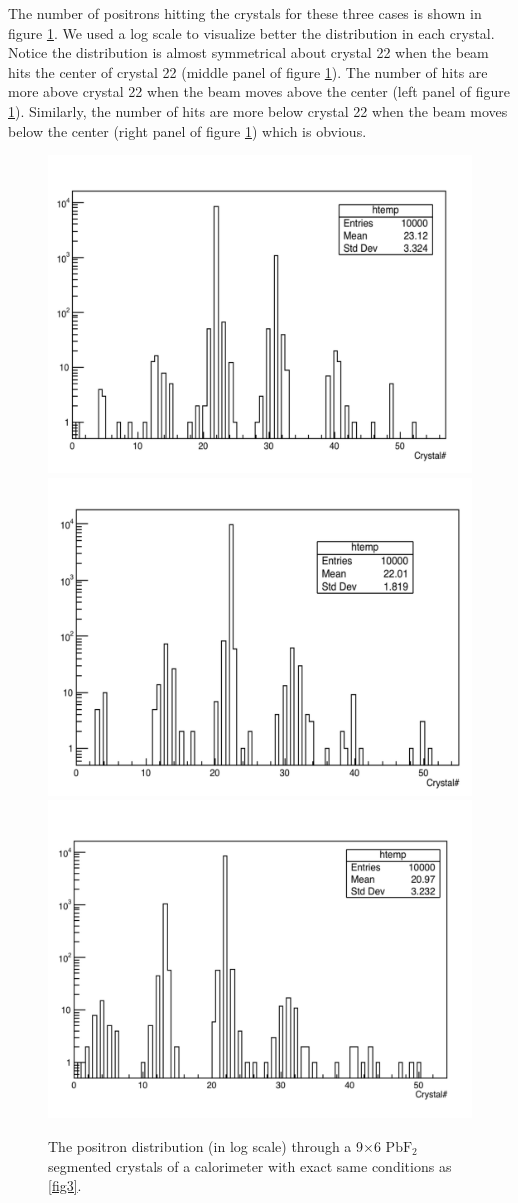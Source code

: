 \documentclass[article,accept,moreauthors,pdftex,10pt,a4paper]{../MDPI_template/Definitions/mdpi}
\begin{document}
The number of positrons hitting the crystals for these three cases is shown in figure \ref{fig4}. 
We used a log scale to visualize better the distribution in each crystal. Notice the distribution is almost symmetrical 
about crystal 22 when the beam hits the center of crystal 22 (middle panel of figure \ref{fig4}). 
The number of hits are more above crystal 22 when the beam moves above the center (left panel of figure \ref{fig4}). 
Similarly, the number of hits are more below crystal 22 when the beam moves 
below the center (right panel of figure \ref{fig4}) which is obvious. 
\begin{figure}[H]
\centering
\includegraphics[width=5 cm]{dist_all_top.pdf}
\includegraphics[width=5 cm]{dist_all_center.pdf}
\includegraphics[width=5 cm]{dist_all_bottom.pdf}
\caption{\label{fig4} The positron  distribution (in log scale) through a 9$\times$6 $\mathrm{PbF_2}$ segmented 
crystals of a calorimeter with exact same conditions as \ref{fig3}.}
\end{figure} 

\end{document}
